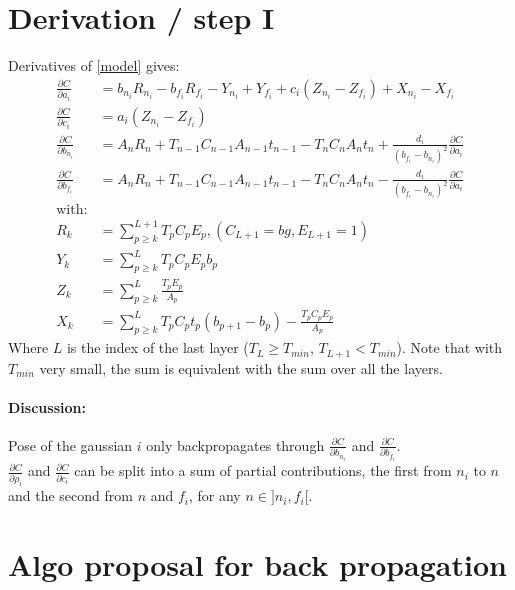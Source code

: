 \documentclass{article}
\begin{document}
\section{Derivation / step I}


Derivatives of \ref{model} gives:
\begin{align}
    \frac{\partial C}{\partial a_i} & = b_{n_i} R_{n_i} - b_{f_i} R_{f_i} - Y_{n_i} + Y_{f_i} + c_i (Z_{n_i} - Z_{f_i}) + X_{n_i} - X_{f_i} \\
    \frac{\partial C}{\partial c_i} & = a_i (Z_{n_i} - Z_{f_i}) \\
    \frac{\partial C}{\partial b_{n_i}} & = A_{n} R_n + T_{n-1} C_{n-1} A_{n-1} t_{n-1} - T_n C_n A_n t_n + \frac{d_i}{(b_{f_i} - b_{n_i})^2} \frac{\partial C}{\partial a_i} \\
    \frac{\partial C}{\partial b_{f_i}} & = A_{n} R_n + T_{n-1} C_{n-1} A_{n-1} t_{n-1} - T_n C_n A_n t_n - \frac{d_i}{(b_{f_i} - b_{n_i})^2} \frac{\partial C}{\partial a_i} \\
    \text{with:} \nonumber \\
    R_k & = \sum_{p \geq k}^{L+1} T_p C_p E_p, (C_{L+1}=bg, E_{L+1} = 1) \nonumber \\
    Y_k & = \sum_{p \geq k}^{L} T_p C_p E_p b_p \nonumber \\
    Z_k & = \sum_{p \geq k}^{L} \frac{T_p E_p}{A_p} \nonumber \\
    X_k & = \sum_{p \geq k}^{L} T_p C_p t_p (b_{p+1}-b_p) - \frac{T_p C_p E_p}{A_p}\nonumber
\end{align}
Where $L$ is the index of the last layer ($T_L \geq T_{min}$, $T_{L+1} < T_{min}$). Note that with $T_{min}$ very small, 
the sum is equivalent with the sum over all the layers.

\paragraph{Discussion:}
Pose of the gaussian $i$ only backpropagates through $\frac{\partial C}{\partial b_{n_i}}$ and $\frac{\partial C}{\partial b_{f_i}}$. \\
$\frac{\partial C}{\partial \rho_i}$ and $\frac{\partial C}{\partial c_i}$ can be split into a sum of partial contributions,
the first from $n_i$ to $n$ and the second from $n$ and $f_i$, for any $n \in ]n_i,f_i[$.

\section{Algo proposal for back propagation}
\end{document}
